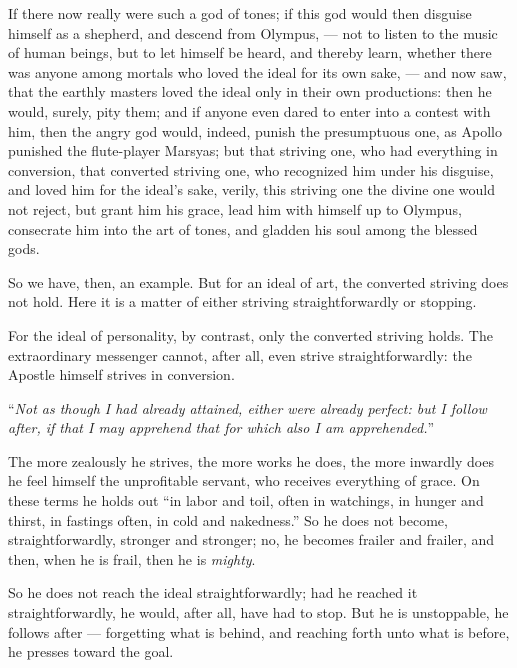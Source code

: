 \documentclass[12pt,a4paper]{book}
\begin{document}
If there now really were such a god of tones; if this god would then disguise himself as a shepherd, and descend
from Olympus, --- not to listen to the music of human beings, but to let himself be heard, and thereby learn, whether there was anyone among mortals who loved the ideal for its own sake, --- and now saw, that the earthly masters loved the ideal only in their own productions: then he would, surely, pity them; and if anyone even dared to enter into a contest with him, then the angry god would, indeed, punish the presumptuous one, as Apollo punished the flute-player Marsyas; but that striving one, who had everything in conversion, that converted striving one, who recognized him under his disguise, and loved him for the ideal's sake, verily, this striving one the divine one would not reject, but grant him his grace, lead him with himself up to Olympus, consecrate him into the art of tones, and gladden his soul among the blessed gods.

So we have, then, an example. But for an ideal of art, the converted striving does not hold. Here it is a matter of either striving straightforwardly or stopping.

For the ideal of personality, by contrast, only the converted striving holds. The extraordinary messenger cannot, after all, even strive straightforwardly: the Apostle himself strives in conversion.

``\emph{Not as though I had already attained, either were already perfect: but I follow after, if that I may apprehend that for which also I am apprehended.}''

The more zealously he strives, the more works he does, the more inwardly does he feel himself the unprofitable servant, who receives everything of grace. On these terms he holds out ``in labor and toil, often in watchings, in hunger and thirst, in fastings often, in cold and nakedness.'' So he does not become, straightforwardly, stronger and stronger; no, he becomes frailer and frailer, and then, when he is frail, then he is \emph{mighty}.

So he does not reach the ideal straightforwardly; had he reached it straightforwardly, he would, after all, have had to stop. But he is unstoppable,
he follows after --- forgetting what is behind, and reaching forth unto what is before, he presses toward the goal.
\end{document}
